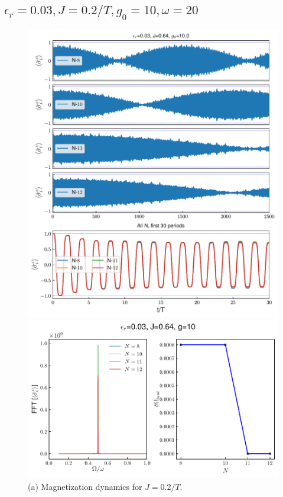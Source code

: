 \documentclass[a4paper, 11pt]{article}
\begin{document}
\subsection{$\epsilon_r = 0.03, J = 0.2/T, g_0 = 10, \omega = 20$}
\begin{figure}[h!]
    \centering
    \begin{minipage}[t]{0.48\textwidth}
        \centering
        \includegraphics[width=\textwidth]{figs/time_mag_epsilon_r0.03_J0.64_g10.0_allN.pdf}
        \caption*{(a) Magnetization dynamics for $J = 0.2/T$.}
    \end{minipage}
    \hfill
    \begin{minipage}[t]{0.48\textwidth}
        \centering
        \includegraphics[width=\textwidth]{figs/DTC_mag_fft_beat_er=0.03_J=0.6366197723675814_g=10.0.pdf}

\end{minipage}
\end{figure}
\end{document}
